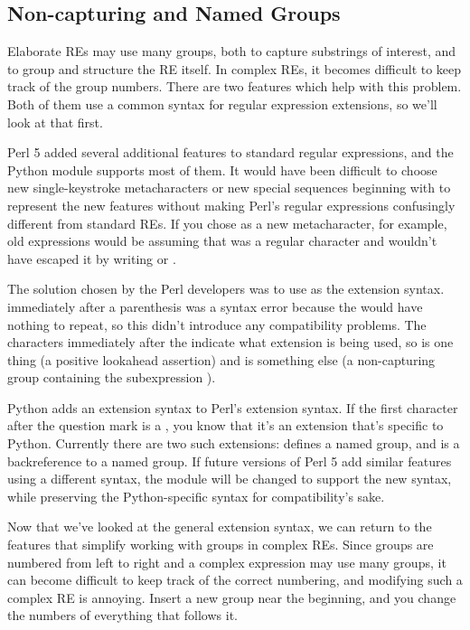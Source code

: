 \documentclass{howto}
\begin{document}
\subsection{Non-capturing and Named Groups}

Elaborate REs may use many groups, both to capture substrings of
interest, and to group and structure the RE itself.  In complex REs,
it becomes difficult to keep track of the group numbers.  There are
two features which help with this problem.  Both of them use a common
syntax for regular expression extensions, so we'll look at that first.

Perl 5 added several additional features to standard regular
expressions, and the Python  module supports most of them.
It would have been difficult to choose new single-keystroke
metacharacters or new special sequences beginning with \samp{\e} to
represent the new features without making Perl's regular expressions
confusingly different from standard REs.  If you chose \samp{\&} as a
new metacharacter, for example, old expressions would be assuming that
\samp{\&} was a regular character and wouldn't have escaped it by
writing \regexp{\e \&} or \regexp{[\&]}.  

The solution chosen by the Perl developers was to use 
as the extension syntax.   immediately after a parenthesis was
a syntax error because the  would have nothing to repeat, so
this didn't introduce any compatibility problems.  The characters
immediately after the   indicate what extension is being used,
so  is one thing (a positive lookahead assertion) and
 is something else (a non-capturing group containing
the subexpression ).

Python adds an extension syntax to Perl's extension syntax.  If the
first character after the question mark is a , you know that
it's an extension that's specific to Python.  Currently there are two
such extensions:  defines a named group,
and  is a backreference to a named group.  If
future versions of Perl 5 add similar features using a different
syntax, the  module will be changed to support the new
syntax, while preserving the Python-specific syntax for
compatibility's sake.

Now that we've looked at the general extension syntax, we can return
to the features that simplify working with groups in complex REs.
Since groups are numbered from left to right and a complex expression
may use many groups, it can become difficult to keep track of the
correct numbering, and modifying such a complex RE is annoying.
Insert a new group near the beginning, and you change the numbers of
everything that follows it.
\end{document}
